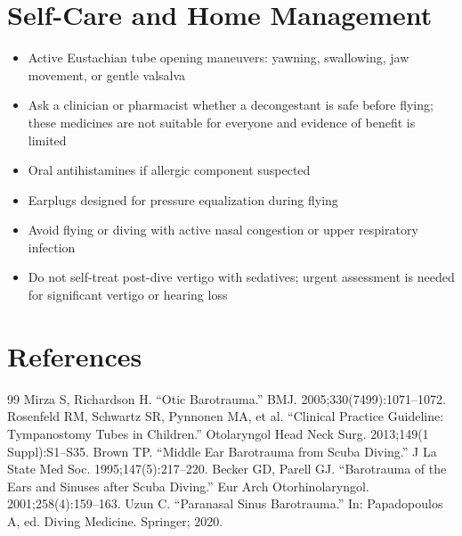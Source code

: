 \section*{Self-Care and Home Management}
\begin{itemize}
  \item Active Eustachian tube opening maneuvers: yawning, swallowing, jaw movement, or gentle valsalva
  \item Ask a clinician or pharmacist whether a decongestant is safe before flying; these medicines are not suitable for everyone and evidence of benefit is limited
  \item Oral antihistamines if allergic component suspected
  \item Earplugs designed for pressure equalization during flying
  \item Avoid flying or diving with active nasal congestion or upper respiratory infection
  \item Do not self-treat post-dive vertigo with sedatives; urgent assessment is needed for significant vertigo or hearing loss
\end{itemize}

\section*{References}
\begin{thebibliography}{99}
 Mirza S, Richardson H. ``Otic Barotrauma.'' BMJ. 2005;330(7499):1071--1072.
 Rosenfeld RM, Schwartz SR, Pynnonen MA, et al. ``Clinical Practice Guideline: Tympanostomy Tubes in Children.'' Otolaryngol Head Neck Surg. 2013;149(1 Suppl):S1--S35.
 Brown TP. ``Middle Ear Barotrauma from Scuba Diving.'' J La State Med Soc. 1995;147(5):217--220.
 Becker GD, Parell GJ. ``Barotrauma of the Ears and Sinuses after Scuba Diving.'' Eur Arch Otorhinolaryngol. 2001;258(4):159--163.
 Uzun C. ``Paranasal Sinus Barotrauma.'' In: Papadopoulos A, ed. Diving Medicine. Springer; 2020.
\end{thebibliography}
